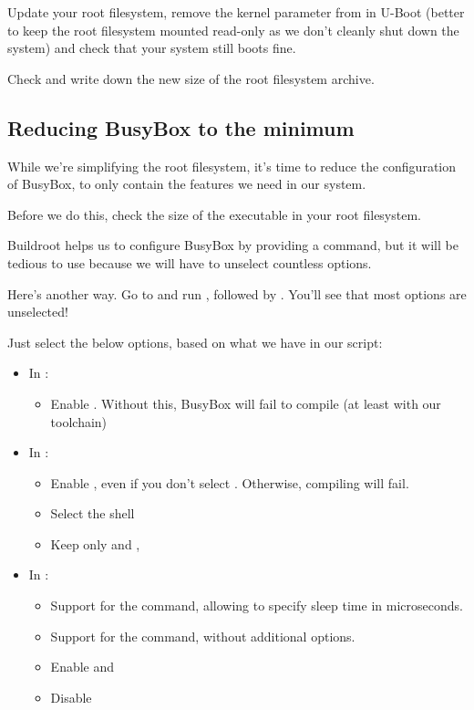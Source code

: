 Update your root filesystem, remove the  kernel parameter from
 in U-Boot (better to keep the root filesystem mounted read-only as we don't
cleanly shut down the system) and check that your system still boots fine.

Check and write down the new size of the root filesystem archive.

\subsection{Reducing BusyBox to the minimum}

While we're simplifying the root filesystem, it's time to reduce the
configuration of BusyBox, to only contain the features we need in our
system.

Before we do this, check the size of the  executable in
your root filesystem.

Buildroot helps us to configure BusyBox by providing a  command, but it will be tedious to use because we
will have to unselect countless options.

Here's another way. Go to  and run
, followed by . You'll see
that most options are unselected!

Just select the below options, based on what we have in our
 script:
\begin{itemize}
  \item In :
  \begin{itemize}
     \item Enable . Without this, BusyBox
           will fail to compile (at least with our toolchain)
  \end{itemize}
  \item In :
  \begin{itemize}
     \item Enable , even
	   if you don't select . Otherwise, compiling
            will fail.
     \item Select the  shell
     \item Keep only  and
           ,
  \end{itemize}
  \item In :
  \begin{itemize}
     \item Support for the  command, allowing to specify
           sleep time in microseconds.
     \item Support for the  command, without additional options.
     \item Enable  and \code{test as [}
     \item Disable 
  \end{itemize}
\end{itemize}

